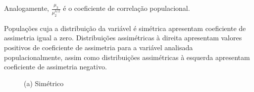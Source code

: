 \documentclass[
  letterpaper,
  DIV=11,
  numbers=noendperiod]{scrreprt}
\begin{document}
Analogamente, \(\frac{\mu_3}{\mu_2^{3/2}}\) é o coeficiente de
correlação populacional.

Populações cuja a distribuição da variável é simétrica apresentam
coeficiente de assimetria igual a zero. Distribuições assimétricas à
direita apresentam valores positivos de coeficiente de assimetria para a
variável analisada populacionalmente, assim como distribuições
assimétricas à esquerda apresentam coeficiente de assimetria negativo.

\begin{figure}

\begin{minipage}[t]{0.50\linewidth}

{\centering 


\caption{(a) Simétrico}

}

\end{minipage}%
%
\begin{minipage}[t]{0.50\linewidth}

{\centering 

}
\end{minipage}
\end{figure}
\end{document}

